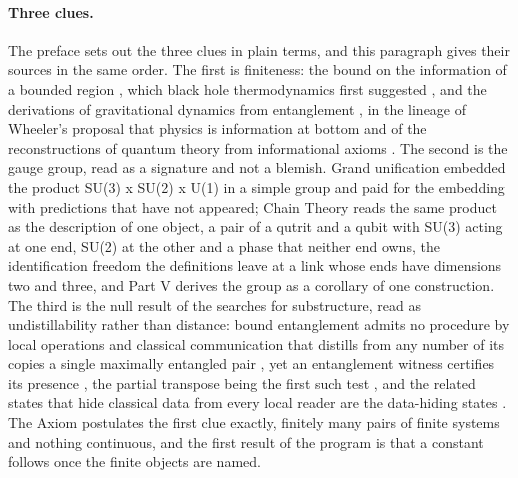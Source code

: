 \paragraph{Three clues.} The preface sets out the three clues in plain terms, and this paragraph gives their sources in the same order. The first is finiteness: the bound on the information of a bounded region \cite{Bekenstein1981}, which black hole thermodynamics first suggested \cite{Bekenstein1973}, and the derivations of gravitational dynamics from entanglement \cite{Jacobson1995,RyuTakayanagi2006,Jacobson2016}, in the lineage of Wheeler's proposal that physics is information at bottom \cite{Wheeler1990} and of the reconstructions of quantum theory from informational axioms \cite{Hardy2001,Chiribella2011}. The second is the gauge group, read as a signature and not a blemish. Grand unification embedded the product SU(3) x SU(2) x U(1) in a simple group \cite{GeorgiGlashow1974} and paid for the embedding with predictions that have not appeared; Chain Theory reads the same product as the description of one object, a pair of a qutrit and a qubit with SU(3) acting at one end, SU(2) at the other and a phase that neither end owns, the identification freedom the definitions leave at a link whose ends have dimensions two and three, and Part V derives the group as a corollary of one construction. The third is the null result of the searches for substructure, read as undistillability rather than distance: bound entanglement admits no procedure by local operations and classical communication that distills from any number of its copies a single maximally entangled pair \cite{Horodecki1998,Horodecki2009}, yet an entanglement witness certifies its presence \cite{Terhal2000}, the partial transpose being the first such test \cite{Peres1996}, and the related states that hide classical data from every local reader are the data-hiding states \cite{DiVincenzo2002}. The Axiom postulates the first clue exactly, finitely many pairs of finite systems and nothing continuous, and the first result of the program is that a constant follows once the finite objects are named.

